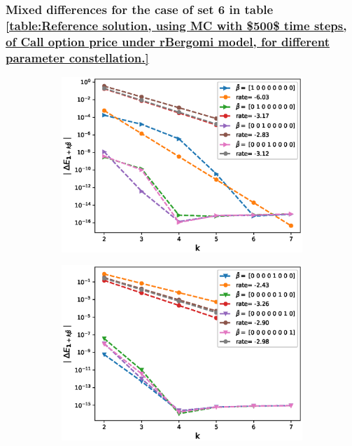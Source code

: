 \documentclass[11pt]{article}
\begin{document}
\subsubsection{Mixed differences for the case of set 6 in table \ref{table:Reference solution, using MC with $500$ time steps, of Call option price under rBergomi model, for different parameter constellation.}}\label{Mixed differences for the case of set 6}
\begin{figure}[h!]
\centering
\begin{subfigure}{.4\textwidth}
\centering
\includegraphics[width=1\linewidth]{./figures/rBergomi_mixed_error_rates/without_change_measure/N_4/H_002/first_difference_rbergomi_4steps_H_002_K_08_totally_hierarch_with_rate_W1}
\caption{}
\label{fig:sub3}
\end{subfigure}%
\begin{subfigure}{.4\textwidth}
\centering
\includegraphics[width=1\linewidth]{./figures/rBergomi_mixed_error_rates/without_change_measure/N_4/H_002/first_difference_rbergomi_4steps_H_002_K_08_totally_hierarch_with_rate_W2}
\caption{}
\label{fig:sub4}
\end{subfigure}




\end{figure}
\end{document}
